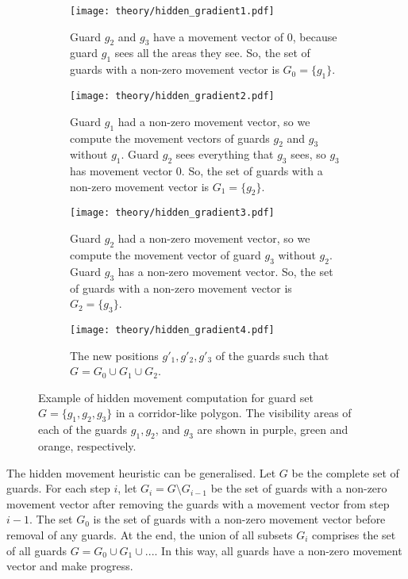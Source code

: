 \begin{figure}[h!]
    \centering
    \begin{subfigure}{0.45\textwidth}
        \texttt{[image: theory/hidden\_gradient1.pdf]}
        \caption{Guard $g_2$ and $g_3$ have a movement vector of 0, because guard $g_1$ sees all the areas they see. So, the set of guards with a non-zero movement vector is $G_0 = \{g_1\}$.}
        \label{fig:hidden_gradient1}
    \end{subfigure}
    \hfill
    \begin{subfigure}{0.45\textwidth}
        \texttt{[image: theory/hidden\_gradient2.pdf]}
        \caption{Guard $g_1$ had a non-zero movement vector, so we compute the movement vectors of guards $g_2$ and $g_3$ without $g_1$. Guard $g_2$ sees everything that $g_3$ sees, so $g_3$ has movement vector 0. So, the set of guards with a non-zero movement vector is $G_1 = \{g_2\}$.}
        \label{fig:hidden_gradient2}
    \end{subfigure}
    \begin{subfigure}{0.45\textwidth}
        \texttt{[image: theory/hidden\_gradient3.pdf]}
        \caption{Guard $g_2$ had a non-zero movement vector, so we compute the movement vector of guard $g_3$ without $g_2$. Guard $g_3$ has a non-zero movement vector. So, the set of guards with a non-zero movement vector is $G_2 = \{g_3\}$.}
        \label{fig:hidden_gradient3}
    \end{subfigure}
    \hfill
    \begin{subfigure}{0.45\textwidth}
        \texttt{[image: theory/hidden\_gradient4.pdf]}
        \caption{The new positions $g'_1, g'_2, g'_3$ of the guards such that $G = G_0 \cup G_1 \cup G_2$.}
        \label{fig:hidden_gradient4}
    \end{subfigure}
    \caption{Example of hidden movement computation for guard set $G = \{g_1, g_2, g_3\}$ in a corridor-like polygon. The visibility areas of each of the guards $g_1, g_2$, and $g_3$ are shown in purple, green and orange, respectively.}
    \label{fig:hidden_gradient}
\end{figure}

\newpage
The hidden movement heuristic can be generalised. Let $G$ be the complete set of guards. For each step $i$, let $G_i = G \setminus G_{i - 1}$ be the set of guards with a non-zero movement vector after removing the guards with a movement vector from step $i - 1$. The set $G_0$ is the set of guards with a non-zero movement vector before removal of any guards. At the end, the union of all subsets $G_i$ comprises the set of all guards $G = G_0 \cup G_1 \cup ...$.
In this way, all guards  have a non-zero movement vector and make progress.

